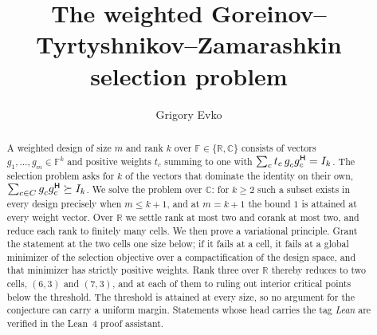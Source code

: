 \documentclass[11pt]{amsart}
\newcommand{\R}{\mathbb{R}}
\newcommand{\C}{\mathbb{C}}
\newcommand{\FF}{\mathbb{F}}
\newcommand{\psd}{\succeq}
\newcommand{\adj}{^{\mathsf{H}}}
\theoremstyle{plain}
\theoremstyle{definition}
\theoremstyle{remark}
\begin{document}
\title[The weighted GTZ selection problem]{The weighted
Goreinov--Tyrtyshnikov--Zamarashkin selection problem}

\author{Grigory Evko}

\begin{abstract}
A weighted design of size $m$ and rank $k$ over $\FF\in\{\R,\C\}$ consists
of vectors $g_1,\dots,g_m\in\FF^{k}$ and positive weights $t_c$ summing to
one with $\sum_c t_c\,g_c^{\vphantom{\mathsf{H}}} g_c\adj=I_k$.  The selection
problem asks for $k$ of the vectors that dominate the identity on their
own, $\sum_{c\in C} g_c^{\vphantom{\mathsf{H}}} g_c\adj\psd I_k$.  We solve the
problem over $\C$: for $k\ge2$ such a subset exists in every design
precisely when $m\le k+1$, and at $m=k+1$ the bound $1$ is attained at
every weight vector.  Over $\R$ we settle rank at most two and corank at
most two, and reduce each rank to finitely many cells.  We then prove a
variational principle.  Grant the statement at the two cells one size
below; if it fails at a cell, it fails at a global minimizer of the
selection objective over a compactification of the design space, and that
minimizer has strictly positive weights.  Rank three over $\R$ thereby
reduces to two cells, $(6,3)$ and $(7,3)$, and at each of them to ruling
out interior critical points below the threshold.  The threshold is
attained at every size, so no argument for the conjecture can carry a
uniform margin.  Statements whose head carries the tag \emph{Lean} are
verified in the Lean~4 proof assistant.
\end{abstract}

\maketitle
\thispagestyle{plain}
\tableofcontents












\appendix







\end{document}
